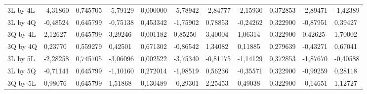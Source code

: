 \begin{table}[H]
{\begin{tabular}{lllllllllll}
\rowcolor[HTML]{FFFFFF} 
3L by 4L       & {\color[HTML]{FF0000} -4,31860} & {\color[HTML]{FF0000} 0,745705} & {\color[HTML]{FF0000} -5,79129} & {\color[HTML]{FF0000} 0,000000} & {\color[HTML]{FF0000} -5,78942} & {\color[HTML]{FF0000} -2,84777} & {\color[HTML]{FF0000} -2,15930} & {\color[HTML]{FF0000} 0,372853} & {\color[HTML]{FF0000} -2,89471} & {\color[HTML]{FF0000} -1,42389} \\
\rowcolor[HTML]{FFFFFF} 
3L by 4Q       & {\color[HTML]{181A1B} -0,48524} & {\color[HTML]{181A1B} 0,645799} & {\color[HTML]{181A1B} -0,75138} & {\color[HTML]{181A1B} 0,453342} & {\color[HTML]{181A1B} -1,75902} & {\color[HTML]{181A1B} 0,78853}  & {\color[HTML]{181A1B} -0,24262} & {\color[HTML]{181A1B} 0,322900} & {\color[HTML]{181A1B} -0,87951} & {\color[HTML]{181A1B} 0,39427}  \\
\rowcolor[HTML]{FFFFFF} 
3Q by 4L       & {\color[HTML]{FF0000} 2,12627}  & {\color[HTML]{FF0000} 0,645799} & {\color[HTML]{FF0000} 3,29246}  & {\color[HTML]{FF0000} 0,001182} & {\color[HTML]{FF0000} 0,85250}  & {\color[HTML]{FF0000} 3,40004}  & {\color[HTML]{FF0000} 1,06314}  & {\color[HTML]{FF0000} 0,322900} & {\color[HTML]{FF0000} 0,42625}  & {\color[HTML]{FF0000} 1,70002}  \\
\rowcolor[HTML]{FFFFFF} 
3Q by 4Q       & {\color[HTML]{181A1B} 0,23770}  & {\color[HTML]{181A1B} 0,559279} & {\color[HTML]{181A1B} 0,42501}  & {\color[HTML]{181A1B} 0,671302} & {\color[HTML]{181A1B} -0,86542} & {\color[HTML]{181A1B} 1,34082}  & {\color[HTML]{181A1B} 0,11885}  & {\color[HTML]{181A1B} 0,279639} & {\color[HTML]{181A1B} -0,43271} & {\color[HTML]{181A1B} 0,67041}  \\
\rowcolor[HTML]{FFFFFF} 
3L by 5L       & {\color[HTML]{FF0000} -2,28258} & {\color[HTML]{FF0000} 0,745705} & {\color[HTML]{FF0000} -3,06096} & {\color[HTML]{FF0000} 0,002522} & {\color[HTML]{FF0000} -3,75340} & {\color[HTML]{FF0000} -0,81175} & {\color[HTML]{FF0000} -1,14129} & {\color[HTML]{FF0000} 0,372853} & {\color[HTML]{FF0000} -1,87670} & {\color[HTML]{FF0000} -0,40588} \\
\rowcolor[HTML]{FFFFFF} 
3L by 5Q       & {\color[HTML]{181A1B} -0,71141} & {\color[HTML]{181A1B} 0,645799} & {\color[HTML]{181A1B} -1,10160} & {\color[HTML]{181A1B} 0,272014} & {\color[HTML]{181A1B} -1,98519} & {\color[HTML]{181A1B} 0,56236}  & {\color[HTML]{181A1B} -0,35571} & {\color[HTML]{181A1B} 0,322900} & {\color[HTML]{181A1B} -0,99259} & {\color[HTML]{181A1B} 0,28118}  \\
\rowcolor[HTML]{FFFFFF} 
3Q by 5L       & {\color[HTML]{181A1B} 0,98076}  & {\color[HTML]{181A1B} 0,645799} & {\color[HTML]{181A1B} 1,51868}  & {\color[HTML]{181A1B} 0,130489} & {\color[HTML]{181A1B} -0,29301} & {\color[HTML]{181A1B} 2,25453}  & {\color[HTML]{181A1B} 0,49038}  & {\color[HTML]{181A1B} 0,322900} & {\color[HTML]{181A1B} -0,14651} & {\color[HTML]{181A1B} 1,12727}  \\

\end{tabular}}
\end{table}
